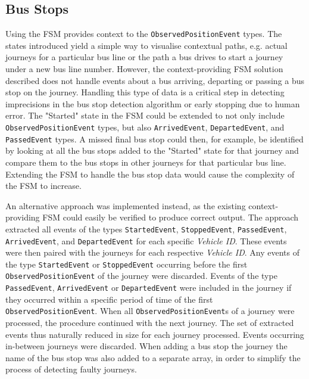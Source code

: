 \subsection{Bus Stops}
Using the FSM provides context to the \texttt{ObservedPositionEvent} types.
The states introduced yield a simple way to visualise contextual paths, e.g. actual journeys for a particular bus line or the path a bus drives to start a journey under a new bus line number.
However, the context-providing FSM solution described does not handle events about a bus arriving, departing or passing a bus stop on the journey.
Handling this type of data is a critical step in detecting imprecisions in the bus stop detection algorithm or early stopping due to human error.
The "Started" state in the FSM could be extended to not only include \texttt{ObservedPositionEvent} types, but also \texttt{ArrivedEvent}, \texttt{DepartedEvent}, and \texttt{PassedEvent} types.
A missed final bus stop could then, for example, be identified by looking at all the bus stops added to the "Started" state for that journey and compare them to the bus stops in other journeys for that particular bus line.
Extending the FSM to handle the bus stop data would cause the complexity of the FSM to increase.

An alternative approach was implemented instead, as the existing context-providing FSM could easily be verified to produce correct output.
The approach extracted all events of the types \texttt{StartedEvent}, \texttt{StoppedEvent}, \texttt{PassedEvent}, \texttt{ArrivedEvent}, and \texttt{DepartedEvent} for each specific \textit{Vehicle ID}.
These events were then paired with the journeys for each respective \textit{Vehicle ID}.
Any events of the type \texttt{StartedEvent} or \texttt{StoppedEvent} occurring before the first \texttt{ObservedPositionEvent} of the journey were discarded.
Events of the type \texttt{PassedEvent}, \texttt{ArrivedEvent} or \texttt{DepartedEvent} were included in the journey if they occurred within a specific period of time of the first \texttt{ObservedPositionEvent}. 
When all \texttt{ObservedPositionEvent}s of a journey were processed, the procedure continued with the next journey.
The set of extracted events thus naturally reduced in size for each journey processed.
Events occurring in-between journeys were discarded.
When adding a bus stop the journey the name of the bus stop was also added to a separate array, in order to simplify the process of detecting faulty journeys.

